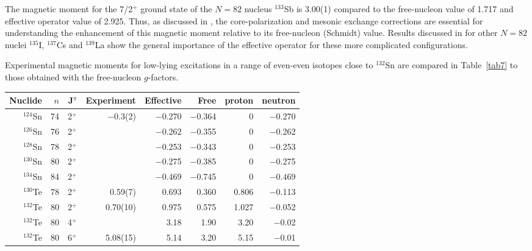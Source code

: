 \documentclass[aps,twocolumn,superscriptaddress,prc,showpacs]{revtex4}
\begin{document}
The magnetic moment for the 7/2$^+$ ground state of the
$N=82$ nucleus $^{133}$Sb is 3.00(1) \cite{St97} compared to the 
free-nucleon value of 1.717 and effective operator
value of 2.925. Thus, as discussed in \cite{St97}, the
core-polarization and mesonic exchange corrections 
are essential for understanding the enhancement of this
magnetic moment relative to its free-nucleon (Schmidt)
value. Results discussed in \cite{white} for other
$N=82$ nuclei $^{135}$I, $^{137}$Cs and $^{139}$La
show the general importance of the effective operator
for these more complicated configurations. 

Experimental magnetic moments for low-lying excitations
in a range of even-even isotopes close to $^{132}$Sn are
compared in Table~\ref{tab7} to those
obtained with the free-nucleon $  g  $-factors.
\begingroup
\begin{table*}
 \caption{\label{tab7}Experimental and calculated magnetic moments.
The calculations use the free-nucleon $  g  $-factors and
 effective $  g  $-factors. The last two columns give the proton
and neutron contributions 
to the effective operator moments. Results for 4$^{ + }$ and 6$^{ + }$ states
are added
for comparison to related experiment data.}
\begin{ruledtabular}
\begin{tabular}{rrrrrrrr}
 Nuclide & $n$ & J$^{ \pi }$ & Experiment  &
Effective & Free & proton & neutron \\
\hline
 $^{124}$Sn & 74 & 2$^{ + }$ & $-$0.3(2)\protect\cite{njs}  & $-$0.270 & $-$0.364 & 0 & $-$0.270 \\
 $^{126}$Sn & 76 & 2$^{ + }$ &          & $-$0.262  & $-$0.355 & 0 & $-$0.262  \\
 $^{128}$Sn & 78 & 2$^{ + }$ &          & $-$0.253  & $-$0.343 & 0 & $-$0.253   \\
 $^{130}$Sn & 80 & 2$^{ + }$ &          & $-$0.275  & $-$0.385 & 0 & $-$0.275   \\
 $^{134}$Sn & 84 & 2$^{ + }$ &          & $-$0.469  & $-$0.745 & 0 & $-$0.469\\
\hline
 $^{130}$Te & 78 & 2$^{ + }$ & 0.59(7)\protect\cite{jak02}  & 0.693 & 0.360  & 0.806 & $-$0.113  \\
 $^{132}$Te & 80 & 2$^{ + }$ & 0.70(10)\protect\cite{ENAM} & 0.975 & 0.575  & 1.027 & $-$0.052\\
 $^{132}$Te & 80 & 4$^{ + }$ &          & 3.18   & 1.90  & 3.20 & $-$0.02  \\
 $^{132}$Te & 80 & 6$^{ + }$ & 5.08(15)\protect\cite{jak02} & 5.14   & 3.20  & 5.15 & $-$0.01  \\

\end{tabular}
\end{ruledtabular}
\end{table*}
\end{document}
